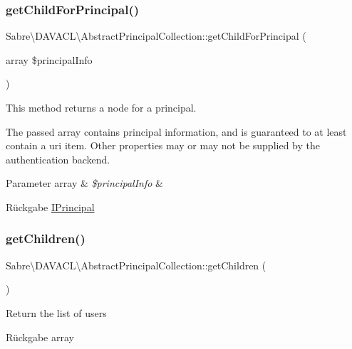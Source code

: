 \subsubsection{\texorpdfstring{get\+Child\+For\+Principal()}{getChildForPrincipal()}}
{\footnotesize\ttfamily Sabre\textbackslash{}\+D\+A\+V\+A\+C\+L\textbackslash{}\+Abstract\+Principal\+Collection\+::get\+Child\+For\+Principal (\begin{DoxyParamCaption}\item[{array}]{\$principal\+Info }\end{DoxyParamCaption})\hspace{0.3cm}{\ttfamily [abstract]}}

This method returns a node for a principal.

The passed array contains principal information, and is guaranteed to at least contain a uri item. Other properties may or may not be supplied by the authentication backend.


\begin{DoxyParams}[1]{Parameter}
array & {\em \$principal\+Info} & \\
\hline
\end{DoxyParams}
\begin{DoxyReturn}{Rückgabe}
\mbox{\hyperlink{interface_sabre_1_1_d_a_v_a_c_l_1_1_i_principal}{I\+Principal}} 
\end{DoxyReturn}
\mbox{\label{class_sabre_1_1_d_a_v_a_c_l_1_1_abstract_principal_collection_abf3123b838a191b0a60d2324ba3e95dc}} 
\subsubsection{\texorpdfstring{get\+Children()}{getChildren()}}
{\footnotesize\ttfamily Sabre\textbackslash{}\+D\+A\+V\+A\+C\+L\textbackslash{}\+Abstract\+Principal\+Collection\+::get\+Children (\begin{DoxyParamCaption}{ }\end{DoxyParamCaption})}

Return the list of users

\begin{DoxyReturn}{Rückgabe}
array 
\end{DoxyReturn}


